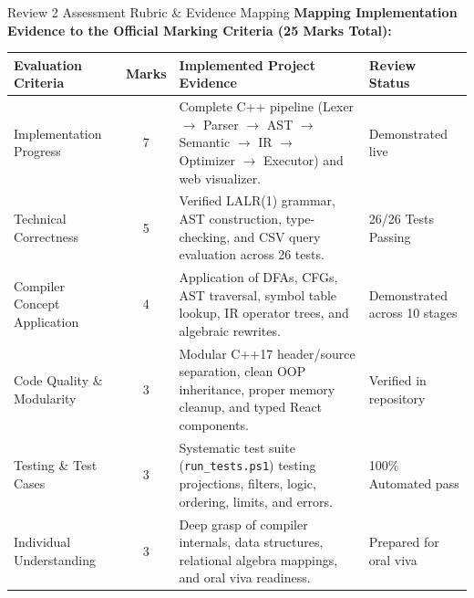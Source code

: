 \documentclass[aspectratio=169,10pt]{beamer}
\begin{document}
\begin{frame}{Review 2 Assessment Rubric \& Evidence Mapping}
    \textbf{Mapping Implementation Evidence to the Official Marking Criteria (25 Marks Total):}
    \vspace{0.4em}
    \begin{table}\footnotesize
    \begin{tabularx}{\textwidth}{l c p{6.2cm} X}
        \toprule
        \textbf{Evaluation Criteria} & \textbf{Marks} & \textbf{Implemented Project Evidence} & \textbf{Review Status} \\
        \midrule
        Implementation Progress & 7 & Complete C++ pipeline (Lexer $\to$ Parser $\to$ AST $\to$ Semantic $\to$ IR $\to$ Optimizer $\to$ Executor) and web visualizer. & Demonstrated live \\
        Technical Correctness & 5 & Verified LALR(1) grammar, AST construction, type-checking, and CSV query evaluation across 26 tests. & 26/26 Tests Passing \\
        Compiler Concept Application & 4 & Application of DFAs, CFGs, AST traversal, symbol table lookup, IR operator trees, and algebraic rewrites. & Demonstrated across 10 stages \\
        Code Quality \& Modularity & 3 & Modular C++17 header/source separation, clean OOP inheritance, proper memory cleanup, and typed React components. & Verified in repository \\
        Testing \& Test Cases & 3 & Systematic test suite (\texttt{run\_tests.ps1}) testing projections, filters, logic, ordering, limits, and errors. & 100\% Automated pass \\
        Individual Understanding & 3 & Deep grasp of compiler internals, data structures, relational algebra mappings, and oral viva readiness. & Prepared for oral viva \\
        \bottomrule
    \end{tabularx}
    \end{table}
\end{frame}
\end{document}
